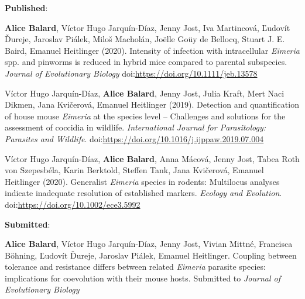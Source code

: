 \textbf{Published}: 
\par
\textbf{Alice Balard}, Víctor Hugo Jarquín-Díaz, Jenny Jost, Iva Martincová, Ľudovít Ďureje, Jaroslav Piálek, Miloš Macholán, Joëlle Goüy de Bellocq, Stuart J. E. Baird, Emanuel Heitlinger (2020). Intensity of infection with intracellular \textit{Eimeria} spp. and pinworms is reduced in hybrid mice compared to parental subspecies. \textit{Journal of Evolutionary Biology} doi:\url{https://doi.org/10.1111/jeb.13578}
\par
Víctor Hugo Jarquín-Díaz, \textbf{Alice Balard}, Jenny Jost, Julia Kraft, Mert Naci Dikmen, Jana Kvičerová, Emanuel Heitlinger (2019). Detection and quantification of house mouse \textit{Eimeria} at the species level – Challenges and solutions for the assessment of coccidia in wildlife. \textit{International Journal for Parasitology: Parasites and Wildlife}. doi:\url{https://doi.org/10.1016/j.ijppaw.2019.07.004}
\par
Víctor Hugo Jarquín-Díaz, \textbf{Alice Balard}, Anna Mácová, Jenny Jost, Tabea Roth von Szepesbéla, Karin Berktold, Steffen Tank, Jana Kvičerová, Emanuel Heitlinger (2020). Generalist \textit{Eimeria} species in rodents: Multilocus analyses indicate inadequate resolution of established markers. \textit{Ecology and Evolution}. doi:\url{https://doi.org/10.1002/ece3.5992}
\par
\textbf{Submitted}:
\par
\textbf{Alice Balard}, Víctor Hugo Jarquín-Díaz, Jenny Jost, Vivian Mittné, Francisca Böhning, Ľudovít Ďureje, Jaroslav Piálek, Emanuel Heitlinger. Coupling between tolerance and resistance differs between related \textit{Eimeria} parasite species: implications for coevolution with their mouse hosts. Submitted to \textit{Journal of Evolutionary Biology}

